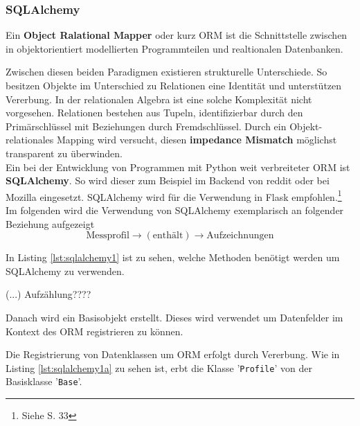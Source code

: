     

    \subsubsection{SQLAlchemy}
    
    Ein  \textbf{Object Ralational Mapper} oder kurz ORM ist die Schnittstelle zwischen in objektorientiert modellierten Programmteilen und realtionalen Datenbanken. 
    
    Zwischen diesen beiden Paradigmen existieren strukturelle Unterschiede. So besitzen Objekte im Unterschied zu Relationen eine Identität und unterstützen Vererbung. In der relationalen Algebra ist eine solche Komplexität nicht vorgesehen. Relationen bestehen aus Tupeln, identifizierbar durch den Primärschlüssel mit Beziehungen durch Fremdschlüssel. Durch ein Objekt-relationales Mapping wird versucht, diesen \textbf{impedance Mismatch} möglichst transparent zu überwinden. \\
    
    Ein bei der Entwicklung von Programmen mit Python weit verbreiteter ORM ist \textbf{SQLAlchemy}. So wird dieser zum Beispiel im Backend von reddit oder bei Mozilla eingesetzt. SQLAlchemy wird für die Verwendung in Flask empfohlen.\footnote{Siehe \cite{openingtheflask} S. 33} \\
    
    
    Im folgenden wird die Verwendung von SQLAlchemy exemplarisch an folgender  Beziehung aufgezeigt \[ \mbox{Messprofil} \to (\mbox{enthält}) \to \mbox{Aufzeichnungen}\] 


    In Listing \ref{lst:sqlalchemy1} ist zu sehen, welche Methoden benötigt werden um SQLAlchemy zu verwenden.
    
    (...)  Aufzählung????
    
    Danach wird ein Basisobjekt erstellt. Dieses wird verwendet um Datenfelder im Kontext des ORM registrieren zu können. 
    
   
    Die Registrierung von Datenklassen um ORM erfolgt durch Vererbung. Wie in Listing \ref{lst:sqlalchemy1a} zu sehen ist, erbt die Klasse '\texttt{Profile}' von der Basisklasse '\texttt{Base}'.
    
